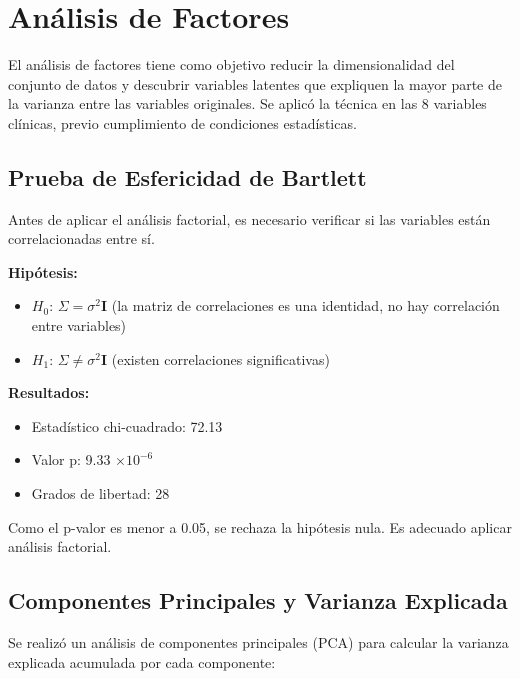 \documentclass[12pt]{report}
\begin{document}

\section{Análisis de Factores}
El análisis de factores tiene como objetivo reducir la dimensionalidad del conjunto de datos y descubrir variables latentes que expliquen la mayor parte de la varianza entre las variables originales. Se aplicó la técnica en las 8 variables clínicas, previo cumplimiento de condiciones estadísticas.

\subsection{Prueba de Esfericidad de Bartlett}
Antes de aplicar el análisis factorial, es necesario verificar si las variables están correlacionadas entre sí.

\textbf{Hipótesis:}
\begin{itemize}
    \item $H_0$: $\Sigma = \sigma^2 \mathbf{I}$ (la matriz de correlaciones es una identidad, no hay correlación entre variables)
    \item $H_1$: $\Sigma \neq \sigma^2 \mathbf{I}$ (existen correlaciones significativas)
\end{itemize}

\textbf{Resultados:}
\begin{itemize}
    \item Estadístico chi-cuadrado: 72.13
    \item Valor p: 9.33 $\times 10^{-6}$
    \item Grados de libertad: 28
\end{itemize}

\noindent Como el p-valor es menor a 0.05, se rechaza la hipótesis nula. Es adecuado aplicar análisis factorial.

\subsection{Componentes Principales y Varianza Explicada}
Se realizó un análisis de componentes principales (PCA) para calcular la varianza explicada acumulada por cada componente:
\end{document}
